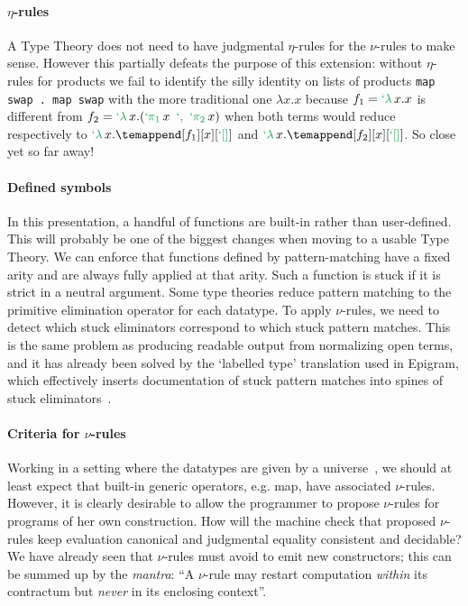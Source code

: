 \documentclass[preprint]{sigplanconf}
\begin{document}
\paragraph{$\eta$-rules} A Type Theory does not need to have judgmental
$\eta$-rules for the $\nu$-rules to make sense. However this partially defeats
the purpose of this extension: without $\eta$-rules for products we fail to
identify the silly identity on lists of products \texttt{map swap . map swap}
with the more traditional one $\lambda x. x$ because $f_1 = \telam x. x$ is
different from $f_2 = \telam x. (\tepiun x \tepair \tepide x)$ when both terms
would reduce respectively to $\telam x. \temappend[f_1][x][\tenil]$ and
$\telam x. \temappend[f_2][x][\tenil]$. So close yet so far away!

\paragraph{Defined symbols} In this presentation, a handful of functions are
built-in rather than user-defined. This will probably be one of the biggest
changes when moving to a usable Type Theory.  We can enforce that functions
defined by pattern-matching have a fixed arity and are always fully applied
at that arity. Such a function is stuck if it is strict in a neutral argument.
Some type theories reduce pattern matching to the primitive elimination
operator for each datatype. To apply $\nu$-rules, we need to detect which
stuck eliminators correspond to which stuck pattern matches. This is the
same problem as producing readable output from normalizing open terms,
and it has already been solved by the `labelled type' translation used
in Epigram, which effectively inserts documentation of stuck pattern
matches into spines of stuck eliminators~\cite{epigram}.

\paragraph{Criteria for $\nu$-rules} Working in a setting where the datatypes
are given by a universe~\cite{LevitationPaper}, we should at least expect that
built-in generic operators, e.g. map, have associated $\nu$-rules. However, it
is clearly desirable to allow the programmer to propose $\nu$-rules for
programs of her own construction. How will the machine check that proposed
$\nu$-rules keep evaluation canonical and judgmental equality consistent and
decidable? We have already seen that $\nu$-rules must avoid to emit new
constructors; this can be summed up by the \textit{mantra}: ``A $\nu$-rule may
restart computation \emph{within} its contractum but \emph{never} in its
enclosing context''.
\end{document}
